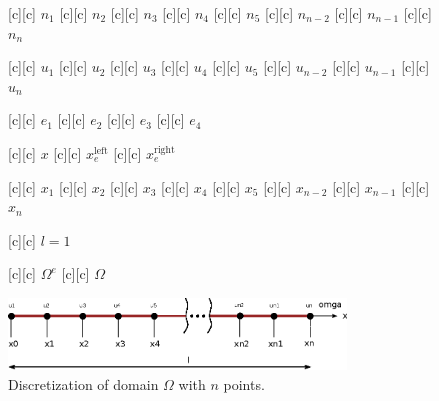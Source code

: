 \begin{figure}[ht]
	\centering
	\footnotesize

	[c] {$n_1$}
	[c] {$n_2$}
	[c] {$n_3$}
	[c] {$n_4$}
	[c] {$n_5$}
	[c] {$n_{n-2}$}
	[c] {$n_{n-1}$}
	[c] {$n_{n}$}


	[c] {$u_1$}
	[c] {$u_2$}
	[c] {$u_3$}
	[c] {$u_4$}
	[c] {$u_5$}
	[c] {$u_{n-2}$}
	[c] {$u_{n-1}$}
	[c] {$u_{n}$}

	[c] {$e_1$}
	[c] {$e_2$}
	[c] {$e_3$}
	[c] {$e_4$}

	[c] {$x$}
	[c] {$x_{e}^{\text{left}}$}
	[c] {$x_{e}^{\text{right}}$}

	[c] {$x_1$}
	[c] {$x_2$}
	[c] {$x_3$}
	[c] {$x_4$}
	[c] {$x_5$}
	[c] {$x_{n-2}$}
	[c] {$x_{n-1}$}
	[c] {$x_{n}$}

	[c] {$l=1$}


	[c] {$\Omega^{e}$}
	[c] {$\Omega$}

	\includegraphics[width=0.8\textwidth]{discretize.eps}

	\caption{Discretization of domain $\Omega$ with $n$ points.}
	\label{\LABEL}
\end{figure}


